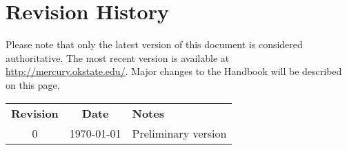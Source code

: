 \section*{Revision History}
Please note that only the latest version of this document is considered authoritative. The most recent version is available at \url{http://mercury.okstate.edu/}. Major changes to the Handbook will be described on this page.

\begin{tabular}{ccl}
\textbf{Revision}	&	\textbf{Date}				&	\textbf{Notes} \\
0					&	\today 						&	Preliminary version \\
\end{tabular}